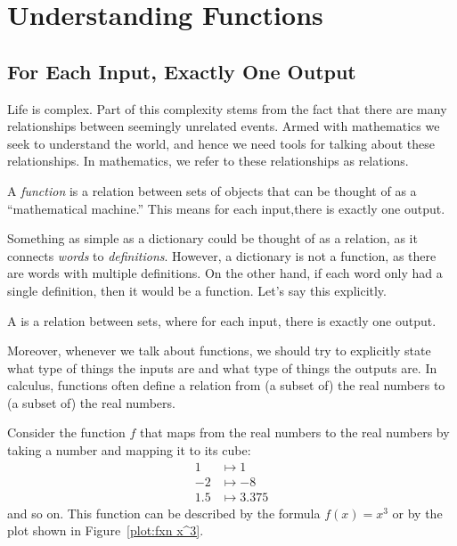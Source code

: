 \documentclass{ximera}
\begin{document}
\chapter{Understanding Functions}

\section{For Each Input, Exactly One Output}

Life is complex. Part of this complexity stems from the fact that
there are many relationships between seemingly unrelated events. Armed
with mathematics we seek to understand the world, and hence we need
tools for talking about these relationships.  In mathematics, we refer to these relationships as relations.  


A \textit{function} is a relation between sets of objects that can be
thought of as a ``mathematical machine.'' 
This means for each input,there is exactly one output. 

Something as simple as a dictionary could be thought of as a relation,
as it connects \textit{words} to \textit{definitions}. However, a
dictionary is not a function, as there are words with multiple
definitions. On the other hand, if each word only had a single
definition, then it would be a function.  Let's say this explicitly.

\begin{definition}
A  is a relation between sets, where for each input,
there is exactly one output.
\end{definition}

Moreover, whenever we talk about functions, we should try to
explicitly state what type of things the inputs are and what type of
things the outputs are.  In calculus, functions often define a
relation from (a subset of) the real numbers to (a subset of) the real
numbers.


\begin{example}
Consider the function $f$ that maps from the real numbers to the real
numbers by taking a number and mapping it to its cube:
\begin{align*}
1 &\mapsto 1\\
-2 &\mapsto -8\\
1.5 &\mapsto 3.375
\end{align*}
and so on. This function can be described by the formula $f(x)=x^3$ or
by the plot shown in Figure~\ref{plot:fxn x^3}.
\end{example}
\end{document}
